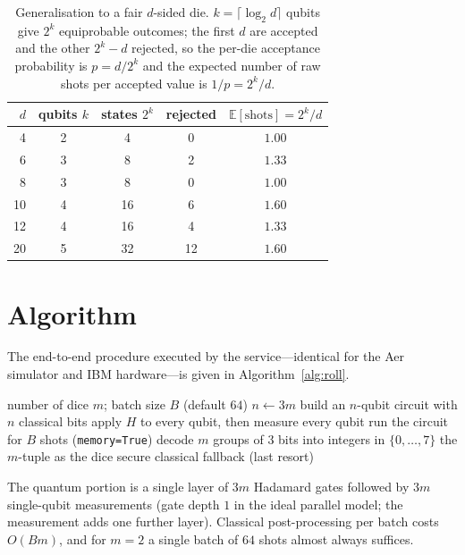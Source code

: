 \documentclass[journal]{IEEEtran}
\begin{document}
\begin{table}[tbp]
\centering
\caption{Generalisation to a fair $d$-sided die. $k=\lceil\log_2 d\rceil$ qubits give $2^k$ equiprobable outcomes; the first $d$ are accepted and the other $2^k-d$ rejected, so the per-die acceptance probability is $p=d/2^k$ and the expected number of raw shots per accepted value is $1/p=2^k/d$.}
\label{tab:gen}
\begin{tabular}{rcccc}
\toprule
$d$ & qubits $k$ & states $2^k$ & rejected & $\mathbb{E}[\text{shots}]=2^k/d$ \\
\midrule
4  & 2 & 4  & 0  & $1.00$ \\
6  & 3 & 8  & 2  & $1.33$ \\
8  & 3 & 8  & 0  & $1.00$ \\
10 & 4 & 16 & 6  & $1.60$ \\
12 & 4 & 16 & 4  & $1.33$ \\
20 & 5 & 32 & 12 & $1.60$ \\
\bottomrule
\end{tabular}
\end{table}

\section{Algorithm}

The end-to-end procedure executed by the service---identical for the Aer simulator and IBM hardware---is given in Algorithm~\ref{alg:roll}.

\begin{algorithm}[tbp]
\caption{Quantum dice roll served by the QBaaS endpoint (identical for the Aer simulator and IBM hardware).}
\label{alg:roll}
\begin{algorithmic}[1]
\Require number of dice $m$; batch size $B$ (default $64$)
\State $n \gets 3m$
\State build an $n$-qubit circuit with $n$ classical bits
\State apply $H$ to every qubit, then measure every qubit
  \State run the circuit for $B$ shots (\texttt{memory=True})
    \State decode $m$ groups of $3$ bits into integers in $\{0,\dots,7\}$
      \State \Return the $m$-tuple as the dice
    \EndIf
  \EndFor
\EndFor
\State \Return secure classical fallback (last resort)
\end{algorithmic}
\end{algorithm}

The quantum portion is a single layer of $3m$ Hadamard gates followed by $3m$ single-qubit measurements (gate depth $1$ in the ideal parallel model; the measurement adds one further layer). Classical post-processing per batch costs $O(Bm)$, and for $m=2$ a single batch of $64$ shots almost always suffices.
\end{document}
